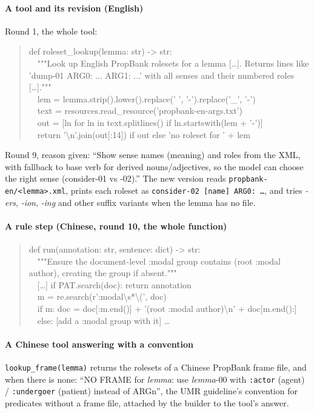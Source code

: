 \paragraph{A tool and its revision (English)} Round 1, the whole tool:
\begin{quote}\scriptsize\ttfamily\raggedright
def roleset\_lookup(lemma: str) -> str:\\
\ \ """Look up English PropBank rolesets for a lemma [\ldots]. Returns lines like 'dump-01 ARG0: ... ARG1: ...' with all senses and their numbered roles [\ldots]."""\\
\ \ lem = lemma.strip().lower().replace(' ', '-').replace('\_', '-')\\
\ \ text = resources.read\_resource('propbank-en-args.txt')\\
\ \ out = [ln for ln in text.splitlines() if ln.startswith(lem + '-')]\\
\ \ return '\textbackslash n'.join(out[:14]) if out else 'no roleset for ' + lem
\end{quote}
Round 9, reason given: ``Show sense names (meaning) and roles from the XML, with fallback to base verb for derived nouns/adjectives, so the model can choose the right sense (consider-01 vs -02).'' The new version reads \texttt{propbank-en/<lemma>.xml}, prints each roleset as \texttt{consider-02 [name] ARG0: \ldots}, and tries \emph{-ers}, \emph{-ion}, \emph{-ing} and other suffix variants when the lemma has no file.

\paragraph{A rule step (Chinese, round 10, the whole function)}
\begin{quote}\scriptsize\ttfamily\raggedright
def run(annotation: str, sentence: dict) -> str:\\
\ \ """Ensure the document-level :modal group contains (root :modal author), creating the group if absent."""\\
\ \ [\ldots] if PAT.search(doc): return annotation\\
\ \ m = re.search(r':modal\textbackslash s*\textbackslash (', doc)\\
\ \ if m: doc = doc[:m.end()] + '(root :modal author)\textbackslash n' + doc[m.end():]\\
\ \ else: [add a :modal group with it] \ldots
\end{quote}

\paragraph{A Chinese tool answering with a convention} \texttt{lookup\_frame(lemma)} returns the rolesets of a Chinese PropBank frame file, and when there is none: ``NO FRAME for \textit{lemma}: use \textit{lemma}-00 with \texttt{:actor} (agent) / \texttt{:undergoer} (patient) instead of ARGn'', the UMR guideline's convention for predicates without a frame file, attached by the builder to the tool's answer.
